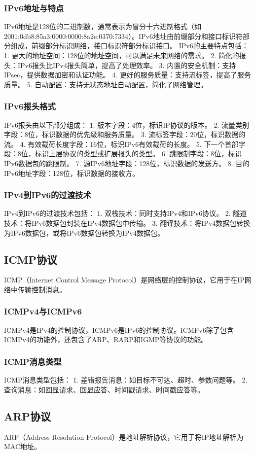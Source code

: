 \documentclass{book}
\begin{document}
\subsubsection{IPv6地址与特点}
IPv6地址是128位的二进制数，通常表示为冒分十六进制格式（如2001:0db8:85a3:0000:0000:8a2e:0370:7334）。IPv6地址由前缀部分和接口标识符部分组成，前缀部分标识网络，接口标识符部分标识接口。
IPv6的主要特点包括：
1. 更大的地址空间：128位的地址空间，可以满足未来网络的需求。
2. 简化的报头：IPv6报头比IPv4报头简单，提高了处理效率。
3. 内置的安全机制：支持IPsec，提供数据加密和认证功能。
4. 更好的服务质量：支持流标签，提高了服务质量。
5. 自动配置：支持无状态地址自动配置，简化了网络管理。
\subsubsection{IPv6报头格式}
IPv6报头由以下部分组成：
1. 版本字段：4位，标识IP协议的版本。
2. 流量类别字段：8位，标识数据的优先级和服务质量。
3. 流标签字段：20位，标识数据的流。
4. 有效载荷长度字段：16位，标识IPv6有效载荷的长度。
5. 下一个首部字段：8位，标识上层协议的类型或扩展报头的类型。
6. 跳限制字段：8位，标识IPv6数据包的跳限制。
7. 源IPv6地址字段：128位，标识数据的发送方。
8. 目的IPv6地址字段：128位，标识数据的接收方。
\subsubsection{IPv4到IPv6的过渡技术}
IPv4到IPv6的过渡技术包括：
1. 双栈技术：同时支持IPv4和IPv6协议。
2. 隧道技术：将IPv6数据包封装在IPv4数据包中传输。
3. 翻译技术：将IPv4数据包转换为IPv6数据包，或将IPv6数据包转换为IPv4数据包。
\subsection{ICMP协议}
ICMP（Internet Control Message Protocol）是网络层的控制协议，它用于在IP网络中传输控制消息。
\subsubsection{ICMPv4与ICMPv6}
ICMPv4是IPv4的控制协议，ICMPv6是IPv6的控制协议。ICMPv6除了包含ICMPv4的功能外，还包含了ARP、RARP和IGMP等协议的功能。
\subsubsection{ICMP消息类型}
ICMP消息类型包括：
1. 差错报告消息：如目标不可达、超时、参数问题等。
2. 查询消息：如回显请求、回显应答、时间戳请求、时间戳应答等。
\subsection{ARP协议}
ARP（Address Resolution Protocol）是地址解析协议，它用于将IP地址解析为MAC地址。
\end{document}
